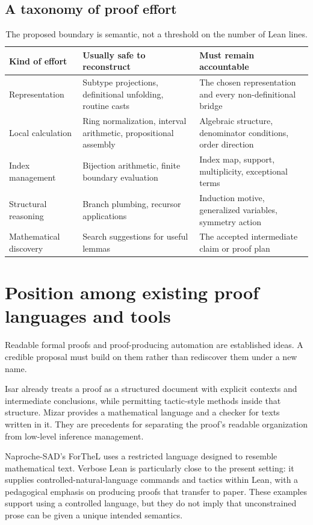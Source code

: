 \documentclass[11pt,a4paper]{article}
\theoremstyle{definition}
\theoremstyle{remark}
\numberwithin{equation}{section}
\begin{document}
\subsection{A taxonomy of proof effort}
\begin{table}[htbp]
\centering\small
\begin{tabularx}{\linewidth}{@{}P{.22\linewidth}YY@{}}
\toprule
Kind of effort & Usually safe to reconstruct & Must remain accountable \\
\midrule
Representation & Subtype projections, definitional unfolding, routine casts & The chosen representation and every non-definitional bridge \\
Local calculation & Ring normalization, interval arithmetic, propositional assembly & Algebraic structure, denominator conditions, order direction \\
Index management & Bijection arithmetic, finite boundary evaluation & Index map, support, multiplicity, exceptional terms \\
Structural reasoning & Branch plumbing, recursor applications & Induction motive, generalized variables, symmetry action \\
Mathematical discovery & Search suggestions for useful lemmas & The accepted intermediate claim or proof plan \\
\bottomrule
\end{tabularx}
\caption{The proposed boundary is semantic, not a threshold on the number of Lean lines.}
\label{tab:effort}
\end{table}

\section{Position among existing proof languages and tools}
\label{sec:prior}
Readable formal proofs and proof-producing automation are established ideas. A credible proposal must build on them rather than rediscover them under a new name.

Isar already treats a proof as a structured document with explicit contexts and intermediate conclusions, while permitting tactic-style methods inside that structure. Mizar provides a mathematical language and a checker for texts written in it. They are precedents for separating the proof's readable organization from low-level inference management.\cite{isar,mizar}

Naproche-SAD's ForTheL uses a restricted language designed to resemble mathematical text. Verbose Lean is particularly close to the present setting: it supplies controlled-natural-language commands and tactics within Lean, with a pedagogical emphasis on producing proofs that transfer to paper. These examples support using a controlled language, but they do not imply that unconstrained prose can be given a unique intended semantics.\cite{naproche,verbose,massot}
\end{document}
